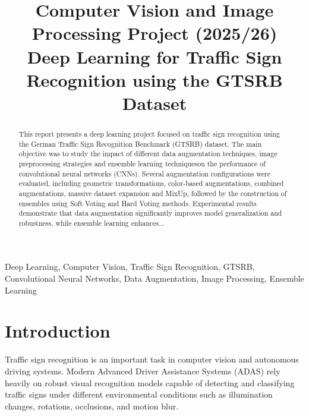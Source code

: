 \documentclass[conference,a4paper]{IEEEtran}
\begin{document}
\title{Computer Vision and Image Processing Project (2025/26)\\
       \Large Deep Learning for Traffic Sign Recognition using the GTSRB Dataset}

\author{

    \and
    \and
}

\maketitle

\begin{abstract}
This report presents a deep learning project focused on traffic sign recognition using the German Traffic Sign Recognition Benchmark (GTSRB) dataset. The main objective was to study the impact of different data augmentation techniques, image preprocessing strategies and ensemble learning techniqueson the performance of convolutional neural networks (CNNs). Several augmentation configurations were evaluated, including geometric transformations, color-based augmentations, combined augmentations, massive dataset expansion and MixUp, followed by the construction of ensembles using Soft Voting and Hard Voting methods. Experimental results demonstrate that data augmentation significantly improves model generalization and robustness, while ensemble learning enhances... 
\end{abstract}

\begin{IEEEkeywords}
Deep Learning, Computer Vision, Traffic Sign Recognition, GTSRB, Convolutional Neural Networks, Data Augmentation, Image Processing, Ensemble Learning
\end{IEEEkeywords}

\section{Introduction}
Traffic sign recognition is an important task in computer vision and autonomous driving systems. Modern Advanced Driver Assistance Systems (ADAS) rely heavily on robust visual recognition models capable of detecting and classifying traffic signs under different environmental conditions such as illumination changes, rotations, occlusions, and motion blur.
\end{document}
